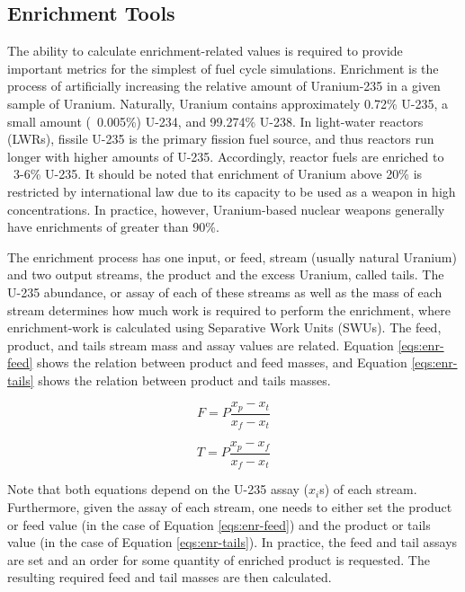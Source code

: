 \subsection{Enrichment Tools}\label{sec:prev-enrich}

The ability to calculate enrichment-related values is required to provide
important metrics for the simplest of fuel cycle simulations. Enrichment is the
process of artificially increasing the relative amount of Uranium-235 in a given
sample of Uranium. Naturally, Uranium contains approximately 0.72\% U-235, a
small amount (~0.005\%) U-234, and 99.274\% U-238. In light-water reactors
(LWRs), fissile U-235 is the primary fission fuel source, and thus reactors run
longer with higher amounts of U-235. Accordingly, reactor fuels are enriched to
~3-6\% U-235. It should be noted that enrichment of Uranium above 20\% is
restricted by international law due to its capacity to be used as a weapon in
high concentrations. In practice, however, Uranium-based nuclear weapons
generally have enrichments of greater than 90\%.

The enrichment process has one input, or feed, stream (usually natural Uranium)
and two output streams, the product and the excess Uranium, called tails. The
U-235 abundance, or assay of each of these streams as well as the mass of each stream
determines how much work is required to perform the enrichment, where
enrichment-work is calculated using Separative Work Units (SWUs). The feed,
product, and tails stream mass and assay values are related. Equation
\ref{eqs:enr-feed} shows the relation between product and feed masses, and
Equation \ref{eqs:enr-tails} shows the relation between product and tails
masses. 

\begin{equation}\label{eqs:enr-feed}
  F = P \frac{x_{p} - x_{t}}{x_{f} - x_{t}}
\end{equation}

\begin{equation}\label{eqs:enr-tails}
  T = P \frac{x_{p} - x_{f}}{x_{f} - x_{t}}
\end{equation}

Note that both equations depend on the U-235 assay ($x_i$s) of each
stream. Furthermore, given the assay of each stream, one needs to either set
the product or feed value (in the case of Equation \ref{eqs:enr-feed}) and the
product or tails value (in the case of Equation \ref{eqs:enr-tails}). In
practice, the feed and tail assays are set and an order for some quantity of
enriched product is requested. The resulting required feed and tail masses are
then calculated.

